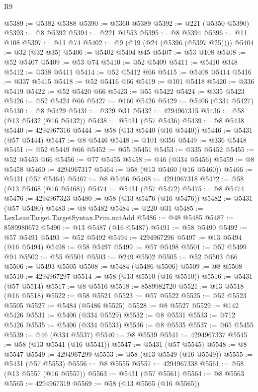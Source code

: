 \begin{lexlean}{R9}
\begin{coremodule}
@5389 := @5382 @5388
@5390 := @5360 @5389
@5392 := @221 (@5350 @5390)
@5393 := @8 @5392
@5394 := @221 @1553
@5395 := @8 @5394
@5396 := @11 @108
@5397 := @11 @74
@5402 := @9 (@19 (@24 (@5396 (@5397 @25))))
@5404 := @32 (@32 @35)
@5406 := @5402 @5404 @45
@5407 := @53 @108
@5408 := @52 @5407
@5409 := @53 @74
@5410 := @52 @5409
@5411 := @5410 @348
@5412 := @338 @5411
@5414 := @52 @5412 @66
@5415 := @5408 @5414
@5416 := @337 @5415
@5418 := @52 @5416 @66
@5419 := @101 @5418
@5420 := @336 @5419
@5422 := @52 @5420 @66
@5423 := @55 @5422
@5424 := @335 @5423
@5426 := @52 @5424 @66
@5427 := @160 @5426
@5429 := @5406 (@334 @5427)
@5430 := @8 @5429
@5431 := @329 @31
@5432 := 4294967315
@5436 := @58 (@13 @5432 (@16 @5432))
@5438 := @5431 (@57 @5436)
@5439 := @8 @5438
@5440 := 4294967316
@5444 := @58 (@13 @5440 (@16 @5440))
@5446 := @5431 (@57 @5444)
@5447 := @8 @5446
@5448 := @101 @356
@5449 := @336 @5448
@5451 := @52 @5449 @66
@5452 := @55 @5451
@5453 := @335 @5452
@5455 := @52 @5453 @66
@5456 := @77 @5455
@5458 := @46 (@334 @5456)
@5459 := @8 @5458
@5460 := 4294967317
@5464 := @58 (@13 @5460 (@16 @5460))
@5466 := @5431 (@57 @5464)
@5467 := @8 @5466
@5468 := 4294967318
@5472 := @58 (@13 @5468 (@16 @5468))
@5474 := @5431 (@57 @5472)
@5475 := @8 @5474
@5476 := 4294967323
@5480 := @58 (@13 @5476 (@16 @5476))
@5482 := @5431 (@57 @5480)
@5483 := @8 @5482
@5484 := @220 @31
@5485 := LexLeanTarget.TargetSyntax.Prim.natAdd
@5486 := @48 @5485
@5487 := 8589980672
@5490 := @13 @5487 (@16 @5487)
@5491 := @58 @5490
@5492 := @57 @5491
@5493 := @52 @5492
@5494 := 4294967296
@5497 := @13 @5494 (@16 @5494)
@5498 := @58 @5497
@5499 := @57 @5498
@5501 := @52 @5499 @94
@5502 := @55 @5501
@5503 := @249 @5502
@5505 := @52 @5503 @66
@5506 := @5493 @5505
@5508 := @5484 (@5486 @5506)
@5509 := @8 @5508
@5510 := 4294967297
@5514 := @58 (@13 @5510 (@16 @5510))
@5516 := @5431 (@57 @5514)
@5517 := @8 @5516
@5518 := 8589982720
@5521 := @13 @5518 (@16 @5518)
@5522 := @58 @5521
@5523 := @57 @5522
@5525 := @52 @5523 @5505
@5527 := @5484 (@5486 @5525)
@5528 := @8 @5527
@5529 := @142 @5426
@5531 := @5406 (@334 @5529)
@5532 := @8 @5531
@5533 := @712 @5426
@5535 := @5406 (@334 @5533)
@5536 := @8 @5535
@5537 := @65 @5455
@5539 := @46 (@334 @5537)
@5540 := @8 @5539
@5541 := 4294967337
@5545 := @58 (@13 @5541 (@16 @5541))
@5547 := @5431 (@57 @5545)
@5548 := @8 @5547
@5549 := 4294967299
@5553 := @58 (@13 @5549 (@16 @5549))
@5555 := @5431 (@57 @5553)
@5556 := @8 @5555
@5557 := 4294967338
@5561 := @58 (@13 @5557 (@16 @5557))
@5563 := @5431 (@57 @5561)
@5564 := @8 @5563
@5565 := 4294967319
@5569 := @58 (@13 @5565 (@16 @5565))

\end{coremodule}
\end{lexlean}
